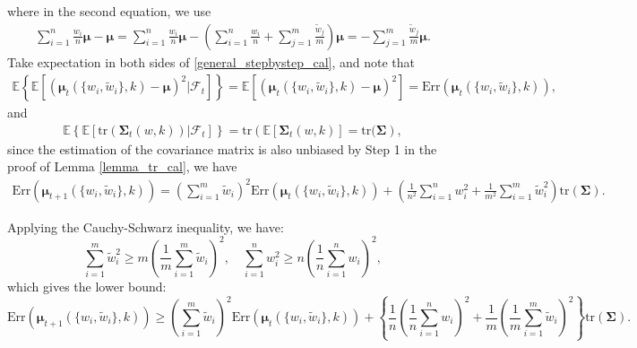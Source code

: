 where in the second equation, we use 
\begin{align*}
\sum_{i=1}^{n}\frac{w_i}{n}\boldsymbol{\mu}-\boldsymbol{\mu}=\sum_{i=1}^{n}\frac{w_i}{n}\boldsymbol{\mu}-(\sum_{i=1}^{n}\frac{w_i}{n}+\sum_{j=1}^{m}\frac{\widetilde{w}_j}{m})\boldsymbol{\mu}=-\sum_{j=1}^{m}\frac{\widetilde{w}_j}{m}\boldsymbol{\mu}.
\end{align*}
Take expectation in both sides of \eqref{general_stepbystep_cal}, and note that 
\begin{align*}
\mathbb{E}\left\{\mathbb{E}[(\bm{\mu}_{t}(\{{w}_i, \widetilde{w}_i\}, k)-\bm{\mu})^2|\mathcal{F}_t]\right\}=\mathbb{E}[(\bm{\mu}_{t}(\{{w}_i, \widetilde{w}_i\}, k)-\bm{\mu})^2]=\mathrm{Err}(\bm{\mu}_{t}(\{w_i, \widetilde{w}_i\}, k)),
\end{align*}
and 
\begin{align*}
\mathbb{E}\left\{\mathbb{E}[\mathrm{tr}(\mathbf{\Sigma}_t(w,k))|\mathcal{F}_t]\right\}=\mathrm{tr}\left(\mathbb{E}[\mathbf{\Sigma}_t(w,k)]=\mathrm{tr}(\mathbf{\Sigma} \right),
\end{align*}
since the estimation of the covariance matrix is also unbiased by Step 1 in the proof of Lemma \ref{lemma_tr_cal}, we have
\begin{align*}
\mathrm{Err}(\bm{\mu}_{t+1}(\{w_i, \widetilde{w}_i\}, k)) = \left(\sum_{i=1}^{m} \widetilde{w}_i \right)^2 \mathrm{Err}(\bm{\mu}_t (\{w_i, \widetilde{w}_i\}, k) ) + \left(\frac{1}{n^2}\sum_{i=1}^{n} w_i^2 + \frac{1}{m^2}\sum_{i=1}^{m} \widetilde{w}_i^2\right)\mathrm{tr}(\bm{\Sigma}).
\end{align*}

Applying the Cauchy-Schwarz inequality, we have:
\begin{equation}
\sum_{i=1}^{m} \widetilde{w}_i^2 \geq m \left(\frac{1}{m}\sum_{i=1}^{m} \widetilde{w}_i\right)^2, \quad \sum_{i=1}^{n} w_i^2 \geq n \left(\frac{1}{n}\sum_{i=1}^{n} w_i\right)^2,
\end{equation}
which gives the lower bound:
\begin{equation*}
\mathrm{Err}(\bm{\mu}_{t+1}(\{w_i, \widetilde{w}_i\}, k)) \geq \left(\sum_{i=1}^{m} \widetilde{w}_i \right)^2 \mathrm{Err}(\bm{\mu}_t (\{w_i, \widetilde{w}_i\}, k) ) + \left\{ \frac{1}{n} \left(\frac{1}{n}\sum_{i=1}^{n} w_i \right)^2 + \frac{1}{m} \left(\frac{1}{m}\sum_{i=1}^{m} \widetilde{w}_i \right)^2 \right\}\mathrm{tr}(\bm{\Sigma}).
\end{equation*}

